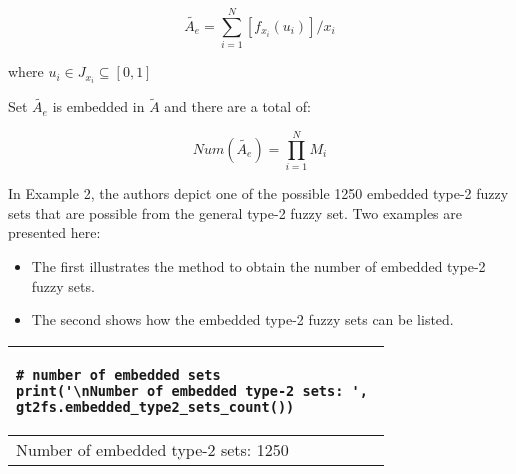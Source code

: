 \documentclass[]{article}
\begin{document}
\begin{equation}
\tilde{A_e} = \displaystyle \sum_{i=1}^{N} \left[ f_{x_{i}} (u_{i}) \right] / x_{i}
\end{equation}

where $u_{i} \in J_{x_{i}} \subseteq [0,1]$

Set $\tilde{A_e}$ is embedded in $\tilde{A}$ and there are a total of:

\begin{equation}
Num(\tilde{A_e}) = \displaystyle \prod_{i=1}^{N} M_i
\end{equation}

\bigskip

In Example 2, the authors depict one of the possible 1250 embedded type-2 fuzzy sets that are possible from the general type-2 fuzzy set. Two examples are presented here:
\begin{itemize}
	\item The first illustrates the method to obtain the number of embedded type-2 fuzzy sets.
	\item The second shows how the embedded type-2 fuzzy sets can be listed.
\end{itemize}

\bigskip

\begin{tabular}{|l|}
\hline 
\lstset{language=Python}
\lstset{basicstyle=\scriptsize}
\begin{lstlisting}
# number of embedded sets
print('\nNumber of embedded type-2 sets: ', 
gt2fs.embedded_type2_sets_count())
\end{lstlisting}
\\
\hline
{\small Number of embedded type-2 sets:  1250}\\
\hline 
\end{tabular} 

\bigskip
\end{document}
